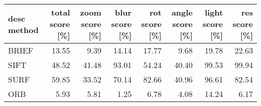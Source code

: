 \begin{tabular}{ l| r r r r r r r }
\label{tab_descperf}
	desc method & total score [\%] & zoom score [\%] & blur score [\%] & rot score [\%] & angle score [\%] & light score [\%] & res score [\%] \\
	\hline
	 BRIEF & 13.55 & 9.39 & 14.14 & 17.77 & 9.68 & 19.78 & 22.63 \\
	 SIFT & 48.52 & 41.48 & 93.01 & 54.24 & 40.40 & 99.53 & 99.94 \\
	 SURF & 59.85 & 33.52 & 70.14 & 82.66 & 40.96 & 96.61 & 82.54 \\
	 ORB & 5.93 & 5.81 & 1.25 & 6.78 & 4.08 & 14.24 & 6.17
\end{tabular}